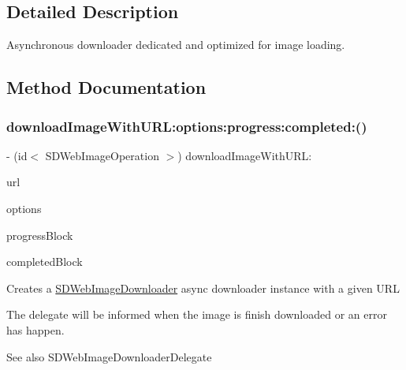 \subsection{Detailed Description}
Asynchronous downloader dedicated and optimized for image loading. 

\subsection{Method Documentation}
\mbox{\label{interface_s_d_web_image_downloader_ab3f450ead0af7471b98a980a41e0d021}} 
\subsubsection{\texorpdfstring{download\+Image\+With\+U\+R\+L\+:options\+:progress\+:completed\+:()}{downloadImageWithURL:options:progress:completed:()}\hspace{0.1cm}{\footnotesize\ttfamily [1/3]}}
{\footnotesize\ttfamily -\/ (id$<$ S\+D\+Web\+Image\+Operation $>$) download\+Image\+With\+U\+R\+L\+: \begin{DoxyParamCaption}\item[{(N\+S\+U\+RL $\ast$)}]{url }\item[{options:(S\+D\+Web\+Image\+Downloader\+Options)}]{options }\item[{progress:(S\+D\+Web\+Image\+Downloader\+Progress\+Block)}]{progress\+Block }\item[{completed:(S\+D\+Web\+Image\+Downloader\+Completed\+Block)}]{completed\+Block }\end{DoxyParamCaption}}

Creates a \mbox{\hyperlink{interface_s_d_web_image_downloader}{S\+D\+Web\+Image\+Downloader}} async downloader instance with a given U\+RL

The delegate will be informed when the image is finish downloaded or an error has happen.

\begin{DoxySeeAlso}{See also}
S\+D\+Web\+Image\+Downloader\+Delegate
\end{DoxySeeAlso}

